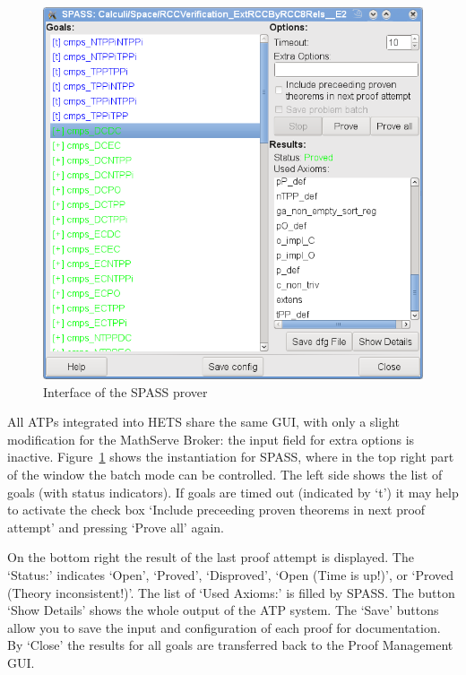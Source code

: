 \documentclass{article}
\newcommand{\normalTEXTSC}[2]{{#1\scriptsize#2}}
\newcommand     {\Hets}{\normalTEXTSC{H}{ETS}\xspace}
\newcommand     {\SPASS}{\normalTEXTSC{S}{PASS}\xspace}
\begin{document}
\begin{figure}
\centering
\includegraphics[width=\textwidth]{spassGUI1}
\caption{Interface of the \SPASS prover\label{fig:SPASS_GUI}}
\end{figure}

All ATPs integrated into \Hets share the same GUI, with only a slight
modification for the MathServe Broker: the input field for extra options is
inactive. Figure~\ref{fig:SPASS_GUI} shows the instantiation for \SPASS, where
in the top right part of the window the batch mode can be controlled.  The
left side shows the list of goals (with status indicators).  If goals are
timed out (indicated by `t') it may help to activate the check box `Include
preceeding proven theorems in next proof attempt' and pressing `Prove all'
again.

On the bottom right the result of the last proof
attempt is displayed.  The `Status:' indicates `Open', `Proved', `Disproved',
`Open (Time is up!)', or `Proved (Theory inconsistent!)'. The list of `Used
Axioms:' is filled by \SPASS. The button `Show Details' shows the whole output
of the ATP system. The `Save' buttons allow you to save the input and
configuration of each proof for documentation. By `Close' the results for all
goals are transferred back to the Proof Management GUI.
\end{document}
